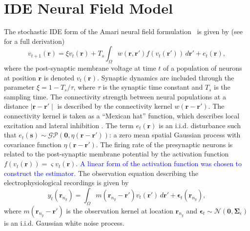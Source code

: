 \documentclass[journal]{IEEEtran}
\newcommand{\parham}[1]{\textcolor{blue}{#1}}
\newcommand{\ken}[1]{\textsf{\emph{\textbf{\textcolor{magenta}{#1}}}}}
\begin{document}
\section{IDE Neural Field Model}
The stochastic IDE form of the Amari neural field  formulation~\cite{Amari1977} is given by (see~\cite{Freestone2011} for a full derivation)
\begin{equation}\label{eq:DiscreteTimeModel}
	v_{t+1}\left(\mathbf{r}\right) = 
	\xi v_t\left(\mathbf{r}\right) + 
	T_s \int_\Omega { 
	    w\left(\mathbf{r},\mathbf{r'}\right)
	    f\left(v_t\left(\mathbf{r}'\right)\right) 
	\, d\mathbf{r}'} 
	+ e_t\left(\mathbf{r}\right), 
\end{equation}
where the post-synaptic membrane voltage at time $t$ of a population of neurons at position $\mathbf r$ is denoted $v_t\left(\mathbf r\right)$. Synaptic dynamics are included through the parameter $\xi=1-T_s/\tau$, where $\tau$ is the synaptic time constant and $T_s$ is the sampling time. The connectivity strength between neural populations at a distance $\mid\mathbf{r}-\mathbf{r'}\mid$ is described by the connectivity kernel $w\left(\mathbf{r}-\mathbf{r}'\right)$. The connectivity kernel is taken as a ``Mexican hat'' function, which describes local excitation and lateral inhibition \cite{Amari1977}. The term $e_t(\mathbf r)$ is an i.i.d. disturbance such that $e_t(\mathbf{s})\sim\mathcal{GP}(\mathbf 0,\eta(\mathbf{r}-\mathbf{r'}))$: a zero mean spatial Gaussian process with covariance function $\eta(\mathbf{r}-\mathbf{r'})$. The firing rate of the presynaptic neurons is related to the post-synaptic membrane potential by the activation function $f(v_t(\mathbf{r})) = \varsigma v_t(\mathbf{r})$. \parham{A linear form of the activation function \cite{Murphy2009} was chosen to construct the estimator.}
The observation equation describing the electrophysiological recordings is given by
\begin{equation}\label{eq:ObservationEquation}
	y_t(\mathbf{r}_{n_y}) = \int_{\Omega} { m\left(\mathbf{r}_{n_y}-\mathbf{r}'\right) v_t\left(\mathbf{r}'\right) \, d\mathbf{r}'} + \boldsymbol\epsilon_t(\mathbf{r}_{n_y}), 
\end{equation}
where $m\left(\mathbf{r}_{n_y}-\mathbf{r}'\right)$ is the observation kernel at location $\mathbf{r}_{n_y}$ and  $\boldsymbol{\epsilon}_{t}\sim \mathcal{N}\left(\mathbf{0},\mathbf{\Sigma}_{\epsilon}\right)$  is an i.i.d. Gaussian white noise process. %
\end{document}
